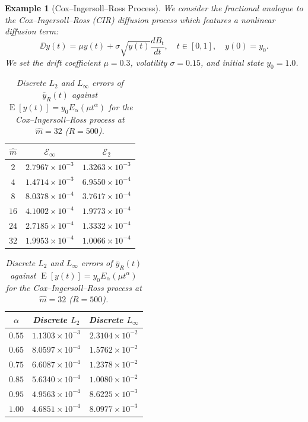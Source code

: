\documentclass[11pt, a4paper]{article}
\theoremstyle{theoremstyle}
\theoremstyle{definitionstyle}
\newtheorem{example}[theorem]{Example}
\DeclareMathOperator{\EE}{\mathrm E}
\newcommand{\sdv}{\frac{dB_t}{dt}}
\begin{document}
\begin{example}[Cox--Ingersoll--Ross Process]
\label{ex:fractional_cir}
We consider the fractional analogue to the Cox--Ingersoll--Ross (CIR) diffusion process which features a nonlinear diffusion term:
\begin{equation}
    \DD y(t) = \mu y(t) + \sigma \sqrt{y(t)} \sdv, \quad t \in [0, 1], \quad y(0) = y_0.
\end{equation}
We set the drift coefficient $\mu = 0.3$, volatility $\sigma = 0.15$, and initial state $y_0 = 1.0$.

\begin{table}[htbp]
\centering
\begin{minipage}[t]{0.48\textwidth}
\centering
\caption{Trajectory errors $\mathcal E_\infty$ and $\mathcal E_2$ for the fractional Cox--Ingersoll--Ross process at $\alpha = 1.0$ across degrees $\hat{m}$ ($R = 500$).}
\label{tab:exp4_cir_stochastic_mse}
\begin{tabular}{ccc}
\toprule
$\hat{m}$ & $\mathcal E_\infty$ & $\mathcal E_2$ \\
\midrule
$2$  & $2.7967 \times 10^{-3}$ & $1.3263 \times 10^{-3}$ \\
$4$  & $1.4714 \times 10^{-3}$ & $6.9550 \times 10^{-4}$ \\
$8$  & $8.0378 \times 10^{-4}$ & $3.7617 \times 10^{-4}$ \\
$16$ & $4.1002 \times 10^{-4}$ & $1.9773 \times 10^{-4}$ \\
$24$ & $2.7185 \times 10^{-4}$ & $1.3332 \times 10^{-4}$ \\
$32$ & $1.9953 \times 10^{-4}$ & $1.0066 \times 10^{-4}$ \\
\bottomrule
\end{tabular}
\end{minipage}
\hfill
\begin{minipage}[t]{0.48\textwidth}
\centering
\caption{Discrete $L_2$ and $L_\infty$ errors of $\bar{y}_R(t)$ against $\EE[y(t)]=y_0E_\alpha(\mu t^\alpha)$ for the Cox--Ingersoll--Ross process at $\hat{m} = 32$ ($R = 500$).}
\label{tab:exp4_cir_mean_error}
\begin{tabular}{ccc}
\toprule
$\alpha$ & Discrete $L_2$ & Discrete $L_\infty$ \\
\midrule
$0.55$ & $1.1303 \times 10^{-3}$ & $2.3104 \times 10^{-2}$ \\
$0.65$ & $8.0597 \times 10^{-4}$ & $1.5762 \times 10^{-2}$ \\
$0.75$ & $6.6087 \times 10^{-4}$ & $1.2378 \times 10^{-2}$ \\
$0.85$ & $5.6340 \times 10^{-4}$ & $1.0080 \times 10^{-2}$ \\
$0.95$ & $4.9563 \times 10^{-4}$ & $8.6225 \times 10^{-3}$ \\
$1.00$ & $4.6851 \times 10^{-4}$ & $8.0977 \times 10^{-3}$ \\
\bottomrule
\end{tabular}
\end{minipage}
\end{table}


\end{example}
\end{document}
